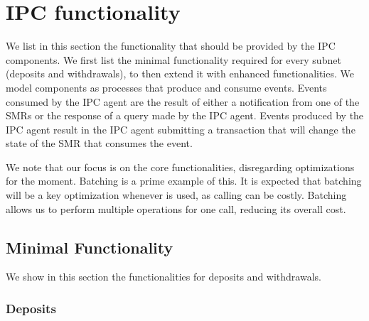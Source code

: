 \section{IPC functionality}
\label{sec:functionality}
We list in this section the functionality that should be provided by the IPC components. We first list the minimal functionality required for every subnet (deposits and withdrawals), to then extend it with enhanced functionalities. We model components as processes that produce and consume events. Events consumed by the IPC agent are the result of either a notification from one of the SMRs or the response of a query made by the IPC agent. Events produced by the IPC agent result in the IPC agent submitting a transaction that will change the state of the SMR that consumes the event.

We note that our focus is on the core functionalities, disregarding optimizations for the moment. Batching is a prime example of this. It is expected that batching will be a key optimization whenever \verifyGfinal{\tx}{\prf} is used, as calling \verifyGfinal{\tx}{\prf} can be costly. Batching allows us to perform multiple operations for one \verifyGfinal{\tx}{\prf} call, reducing its overall cost.

\subsection{Minimal Functionality}
\label{sec:minFunc}
We show in this section the functionalities for deposits and withdrawals.

\subsubsection{Deposits}
\label{sec:deposit}

\\

